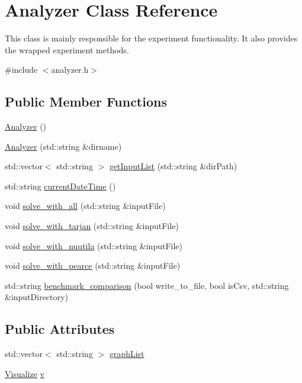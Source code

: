 \hypertarget{class_analyzer}{}\section{Analyzer Class Reference}
\label{class_analyzer}


This class is mainly responsible for the experiment functionality. It also provides the wrapped experiment methods.  




{\ttfamily \#include $<$analyzer.\+h$>$}

\subsection*{Public Member Functions}
\begin{DoxyCompactItemize}
\item 
\hyperlink{class_analyzer_a1be2ff17bba265bdef6e1b44748eaf96}{Analyzer} ()
\item 
\hyperlink{class_analyzer_a2aed8194a48a8385ef271af3bd6fdd42}{Analyzer} (std\+::string \&dirname)
\item 
std\+::vector$<$ std\+::string $>$ \hyperlink{class_analyzer_a39f511f54a8eb89626e7f0ece08c7d02}{get\+Input\+List} (std\+::string \&dir\+Path)
\item 
std\+::string \hyperlink{class_analyzer_a9108681fee1078aed1af2ddee58cc55c}{current\+Date\+Time} ()
\item 
void \hyperlink{class_analyzer_a471ed64111b58f49cfee911b5db93ada}{solve\+\_\+with\+\_\+all} (std\+::string \&input\+File)
\item 
void \hyperlink{class_analyzer_a8207cd71986d26dc8abda1a807490ab2}{solve\+\_\+with\+\_\+tarjan} (std\+::string \&input\+File)
\item 
void \hyperlink{class_analyzer_a5ac77dbb2bbea6b34af561272705d64e}{solve\+\_\+with\+\_\+nuutila} (std\+::string \&input\+File)
\item 
void \hyperlink{class_analyzer_a6009c58addbb9730b54580a5f01ddce7}{solve\+\_\+with\+\_\+pearce} (std\+::string \&input\+File)
\item 
std\+::string \hyperlink{class_analyzer_ae4637e33a985efefebf2a10502be351c}{benchmark\+\_\+comparison} (bool write\+\_\+to\+\_\+file, bool is\+Csv, std\+::string \&input\+Directory)
\end{DoxyCompactItemize}
\subsection*{Public Attributes}
\begin{DoxyCompactItemize}
\item 
std\+::vector$<$ std\+::string $>$ \hyperlink{class_analyzer_a567b5d8b2bbdde28b489834c1644446e}{graph\+List}
\item 
\hyperlink{class_visualize}{Visualize} \hyperlink{class_analyzer_ae32079d0816589617a0c76b1d4cf881b}{v}
\end{DoxyCompactItemize}


